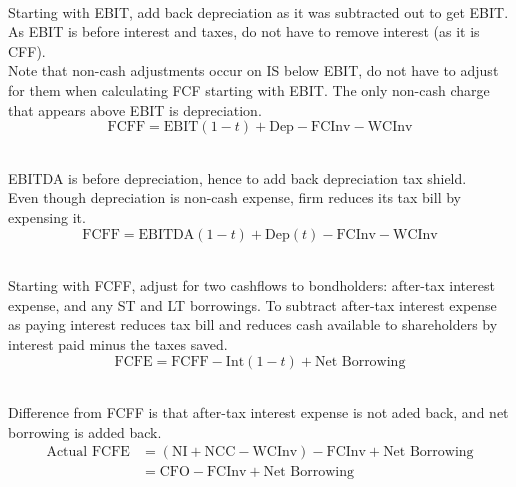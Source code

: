 \begin{method} \\
Starting with EBIT, add back depreciation as it was subtracted out to get EBIT.\\
As EBIT is before interest and taxes, do not have to remove interest (as it is CFF).\\
Note that non-cash adjustments occur on IS below EBIT, do not have to adjust for them when calculating FCF starting with EBIT. The only non-cash charge that appears above EBIT is depreciation.
\begin{equation}
\text{FCFF} = \text{EBIT}(1-t) + \text{Dep} - \text{FCInv} - \text{WCInv} \nonumber
\end{equation}
\end{method}

\begin{method} \\
EBITDA is before depreciation, hence to add back depreciation tax shield.\\
Even though depreciation is non-cash expense, firm reduces its tax bill by expensing it.
\begin{equation}
\text{FCFF} = \text{EBITDA}(1-t) + \text{Dep}(t) - \text{FCInv} - \text{WCInv} \nonumber
\end{equation}
\end{method}

\begin{method} \\
Starting with FCFF, adjust for two cashflows to bondholders: after-tax interest expense, and any ST and LT borrowings. To subtract after-tax interest expense as paying interest reduces tax bill and reduces cash available to shareholders by interest paid minus the taxes saved.
\begin{equation}
\text{FCFE} = \text{FCFF} - \text{Int}(1-t) + \text{Net Borrowing} \nonumber
\end{equation}
\end{method}

\begin{method} \\
Difference from FCFF is that after-tax interest expense is not aded back, and net borrowing is added back.
\begin{align}
\text{Actual FCFE} &= (\text{NI} + \text{NCC} - \text{WCInv}) - \text{FCInv} + \text{Net Borrowing} \nonumber \\
&= \text{CFO} - \text{FCInv} + \text{Net Borrowing} \nonumber
\end{align}
\end{method}

